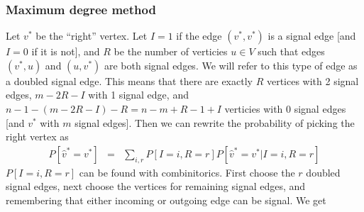 \documentclass{article}
\begin{document}
\subsubsection{Maximum degree method}
Let $v^*$ be the ``right'' vertex. Let $I = 1$ if the edge $(v^*, v^*)$ is a signal edge [and $I=0$ if it is not], and $R$ be the number of verticies $u\in V$ such that edges $(v^*,u)$ and $(u,v^*)$ are both signal edges. We will refer to this type of edge as a doubled signal edge. This means that there are exactly $R$ vertices with 2 signal edges, $m-2R-I$ with 1 signal edge, and $n-1-(m-2R-I)-R = n-m+R-1+I$ verticies with 0 signal edges [and $v^*$ with $m$ signal edges].  Then we can rewrite the probability of picking the right vertex as
\begin{eqnarray}
P[ \hat{v}^* = v^* ]
&=&
\sum_{i,r} P[I=i,R=r]P[\hat{v}^* = v^*|I=i,R=r]
%
\end{eqnarray}
$P[I=i,R=r]$ can be found with combinitorics. First choose the $r$ doubled signal edges, next choose the vertices for remaining signal edges, and remembering that either incoming or outgoing edge can be signal. We get
\end{document}

